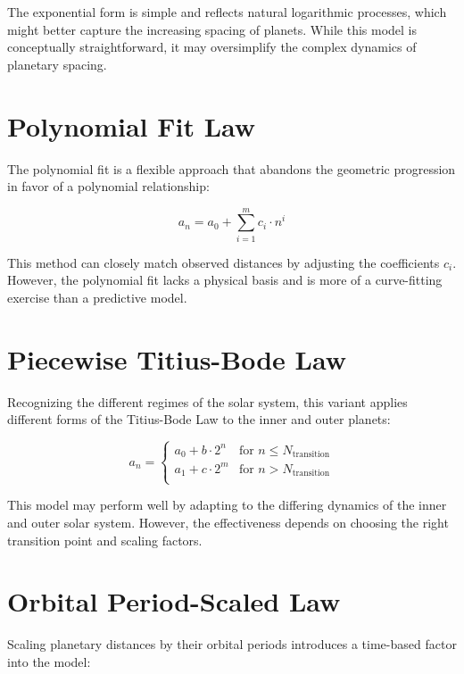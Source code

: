 \documentclass[12pt]{article}
\begin{document}
The exponential form is simple and reflects natural logarithmic processes, which might better capture the increasing spacing of planets. While this model is conceptually straightforward, it may oversimplify the complex dynamics of planetary spacing.

\section{Polynomial Fit Law}

The polynomial fit is a flexible approach that abandons the geometric progression in favor of a polynomial relationship:

\begin{equation}
a_n = a_0 + \sum_{i=1}^{m} c_i \cdot n^i
\end{equation}

This method can closely match observed distances by adjusting the coefficients \(c_i\). However, the polynomial fit lacks a physical basis and is more of a curve-fitting exercise than a predictive model.

\section{Piecewise Titius-Bode Law}

Recognizing the different regimes of the solar system, this variant applies different forms of the Titius-Bode Law to the inner and outer planets:

\begin{equation}
a_n = 
\begin{cases} 
a_0 + b \cdot 2^n & \text{for } n \leq N_{\text{transition}} \\
a_1 + c \cdot 2^m & \text{for } n > N_{\text{transition}} \\
\end{cases}
\end{equation}

This model may perform well by adapting to the differing dynamics of the inner and outer solar system. However, the effectiveness depends on choosing the right transition point and scaling factors.

\section{Orbital Period-Scaled Law}

Scaling planetary distances by their orbital periods introduces a time-based factor into the model:
\end{document}
